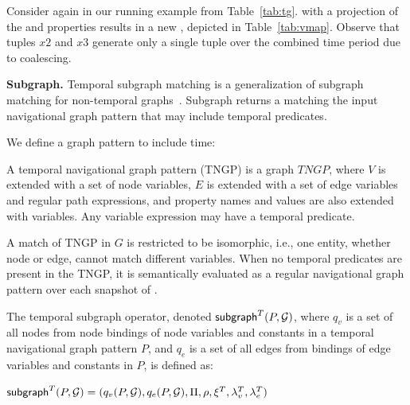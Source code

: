 \begin{example}
Consider again \tg \ttt in our running example from
Table~\ref{tab:tg}.   with a projection of the
 and  properties results in a new \tg,
depicted in Table~\ref{tab:vmap}.  Observe that tuples $x2$ and $x3$
generate only a single tuple over the combined time period due to
coalescing.
\end{example}

{\bf Subgraph.}  Temporal subgraph matching is a generalization of
subgraph matching for non-temporal graphs~\cite{Wood2012}.  Subgraph
returns a \tg matching the input navigational graph pattern that may
include temporal predicates.

We define a graph pattern to include time:

\begin{definition}
\label{def:tngp}
A temporal navigational graph pattern (TNGP) is a graph $TNGP$, where
$V$ is extended with a set of node variables, $E$ is extended with a
set of edge variables and regular path expressions, and property names
and values are also extended with variables.  Any variable expression
may have a temporal predicate.

A match of TNGP in $G$ is restricted to be isomorphic, i.e., one
entity, whether node or edge, cannot match different variables.
When no temporal predicates are present in the TNGP, it is
  semantically evaluated as a regular navigational graph pattern over
  each snapshot of \ttt.
\end{definition}


\begin{definition}
\label{def:subv}
The temporal subgraph operator, denoted $\textsf{subgraph}^T(P,\mathcal{G})$, where $q_v$
is a set of all nodes from node bindings of node variables and
constants in a temporal navigational graph pattern $P$, and $q_e$ is a
set of all edges from bindings of edge variables and constants in $P$,
is defined as:

$\textsf{subgraph}^T(P,\mathcal{G}) = (q_v(P,\mathcal{G}), q_e(P,\mathcal{G}),\Pi,\rho,\xi^T,\lambda^T_v,\lambda^T_e)$
\end{definition}

